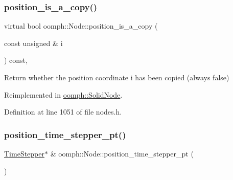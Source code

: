 \mbox{\label{classoomph_1_1Node_a0e1ad244c2b109fb54a2fa6430d6ad5b}} 
\subsubsection{\texorpdfstring{position\+\_\+is\+\_\+a\+\_\+copy()}{position\_is\_a\_copy()}\hspace{0.1cm}{\footnotesize\ttfamily [2/2]}}
{\footnotesize\ttfamily virtual bool oomph\+::\+Node\+::position\+\_\+is\+\_\+a\+\_\+copy (\begin{DoxyParamCaption}\item[{const unsigned \&}]{i }\end{DoxyParamCaption}) const\hspace{0.3cm}{\ttfamily [inline]}, {\ttfamily [virtual]}}



Return whether the position coordinate i has been copied (always false) 



Reimplemented in \hyperlink{classoomph_1_1SolidNode_aa20d88cc797c6635bfd634376c177d87}{oomph\+::\+Solid\+Node}.



Definition at line 1051 of file nodes.\+h.

\mbox{\label{classoomph_1_1Node_a89175b154594ba5b1a6cdde6f385dc71}} 
\subsubsection{\texorpdfstring{position\+\_\+time\+\_\+stepper\+\_\+pt()}{position\_time\_stepper\_pt()}\hspace{0.1cm}{\footnotesize\ttfamily [1/2]}}
{\footnotesize\ttfamily \hyperlink{classoomph_1_1TimeStepper}{Time\+Stepper}$\ast$ \& oomph\+::\+Node\+::position\+\_\+time\+\_\+stepper\+\_\+pt (\begin{DoxyParamCaption}{ }\end{DoxyParamCaption})\hspace{0.3cm}{\ttfamily [inline]}}



